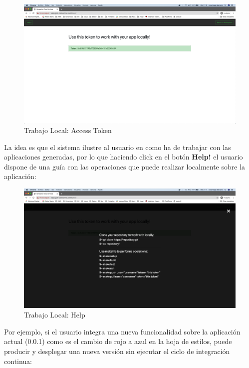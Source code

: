 \documentclass[a4paper,11pt]{book}
\begin{document}
   \begin{figure}[H]
\centering
\includegraphics[scale=0.2]{imagenes/casouso/3_3.png}
\caption{ Trabajo Local:  Access Token  }
\end{figure}

La idea es que el sistema ilustre al usuario en como ha de trabajar con las aplicaciones generadas, por lo  que haciendo click en el botón \textbf{Help!} el usuario dispone de una guía con las operaciones que puede realizar localmente sobre la aplicación:

   \begin{figure}[H]
\centering
\includegraphics[scale=0.2]{imagenes/casouso/3_4.png}
\caption{   Trabajo Local: Help}
\end{figure}

Por ejemplo, si el usuario integra una nueva funcionalidad sobre la aplicación actual (0.0.1) como es el cambio de rojo a azul en la hoja de estilos, puede producir y desplegar una nueva versión sin ejecutar el ciclo de integración continua:
\end{document}
